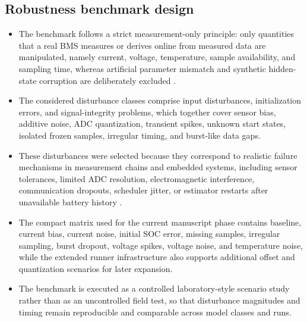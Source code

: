 \documentclass[review]{elsarticle}
\begin{document}
\subsection{Robustness benchmark design}
\begin{itemize}[leftmargin=*]
    \item The benchmark follows a strict measurement-only principle: only quantities that a real BMS measures or derives online from measured data are manipulated, namely current, voltage, temperature, sample availability, and sampling time, whereas artificial parameter mismatch and synthetic hidden-state corruption are deliberately excluded \cite{bergerBenchmarkingBatteryManagement2024}.
    \item The considered disturbance classes comprise input disturbances, initialization errors, and signal-integrity problems, which together cover sensor bias, additive noise, ADC quantization, transient spikes, unknown start states, isolated frozen samples, irregular timing, and burst-like data gaps.
    \item These disturbances were selected because they correspond to realistic failure mechanisms in measurement chains and embedded systems, including sensor tolerances, limited ADC resolution, electromagnetic interference, communication dropouts, scheduler jitter, or estimator restarts after unavailable battery history \cite{liRobustnessSOCEstimation2015,naseriReliableWirelessBMS2025,bergerBenchmarkingBatteryManagement2024}.
    \item The compact matrix used for the current manuscript phase contains baseline, current bias, current noise, initial SOC error, missing samples, irregular sampling, burst dropout, voltage spikes, voltage noise, and temperature noise, while the extended runner infrastructure also supports additional offset and quantization scenarios for later expansion.
    \item The benchmark is executed as a controlled laboratory-style scenario study rather than as an uncontrolled field test, so that disturbance magnitudes and timing remain reproducible and comparable across model classes and runs.
\end{itemize}
\end{document}
